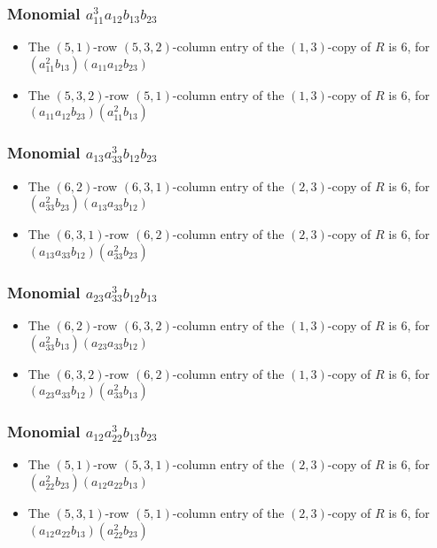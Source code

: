 \documentclass{article}
\begin{document}
\subsubsection{Monomial $ a_{11}^{3} a_{12} b_{13} b_{23} $}

\begin{itemize}
\item The $(5, 1)$-row $(5, 3, 2)$-column entry of the $ \left(1, 3\right) $-copy of $R$ is $ 6 $, for $( a_{11}^{2} b_{13} )( a_{11} a_{12} b_{23} )$ 
\item The $(5, 3, 2)$-row $(5, 1)$-column entry of the $ \left(1, 3\right) $-copy of $R$ is $ 6 $, for $( a_{11} a_{12} b_{23} )( a_{11}^{2} b_{13} )$ 
\end{itemize}
\subsubsection{Monomial $ a_{13} a_{33}^{3} b_{12} b_{23} $}

\begin{itemize}
\item The $(6, 2)$-row $(6, 3, 1)$-column entry of the $ \left(2, 3\right) $-copy of $R$ is $ 6 $, for $( a_{33}^{2} b_{23} )( a_{13} a_{33} b_{12} )$ 
\item The $(6, 3, 1)$-row $(6, 2)$-column entry of the $ \left(2, 3\right) $-copy of $R$ is $ 6 $, for $( a_{13} a_{33} b_{12} )( a_{33}^{2} b_{23} )$ 
\end{itemize}
\subsubsection{Monomial $ a_{23} a_{33}^{3} b_{12} b_{13} $}

\begin{itemize}
\item The $(6, 2)$-row $(6, 3, 2)$-column entry of the $ \left(1, 3\right) $-copy of $R$ is $ 6 $, for $( a_{33}^{2} b_{13} )( a_{23} a_{33} b_{12} )$ 
\item The $(6, 3, 2)$-row $(6, 2)$-column entry of the $ \left(1, 3\right) $-copy of $R$ is $ 6 $, for $( a_{23} a_{33} b_{12} )( a_{33}^{2} b_{13} )$ 
\end{itemize}
\subsubsection{Monomial $ a_{12} a_{22}^{3} b_{13} b_{23} $}

\begin{itemize}
\item The $(5, 1)$-row $(5, 3, 1)$-column entry of the $ \left(2, 3\right) $-copy of $R$ is $ 6 $, for $( a_{22}^{2} b_{23} )( a_{12} a_{22} b_{13} )$ 
\item The $(5, 3, 1)$-row $(5, 1)$-column entry of the $ \left(2, 3\right) $-copy of $R$ is $ 6 $, for $( a_{12} a_{22} b_{13} )( a_{22}^{2} b_{23} )$ 
\end{itemize}
\end{document}
